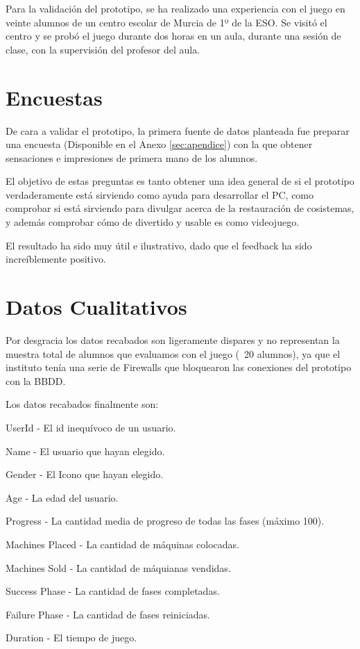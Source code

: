 Para la validación del prototipo, se ha realizado una experiencia con el juego en veinte alumnos de un centro escolar de Murcia de 1º de la ESO. Se visitó el centro y se probó el juego durante dos horas en un aula, durante una sesión de clase, con la supervisión del profesor del aula.

\section{Encuestas}

De cara a validar el prototipo, la primera fuente de datos planteada fue preparar una encuesta (Disponible en el Anexo \ref{sec:apendice}) con la que obtener sensaciones e impresiones de primera mano de los alumnos.

El objetivo de estas preguntas es tanto obtener una idea general de si el prototipo verdaderamente está sirviendo como ayuda para desarrollar el PC, como comprobar si está sirviendo para divulgar acerca de la restauración de cosistemas, y además comprobar cómo de divertido y usable es como videojuego.

El resultado ha sido muy útil e ilustrativo, dado que el feedback ha sido increíblemente positivo. 

\section{Datos Cualitativos}

Por desgracia los datos recabados son ligeramente dispares y no representan la muestra total de alumnos que evaluamos con el juego (~20 alumnos), ya que el instituto tenía una serie de Firewalls que bloquearon las conexiones del prototipo con la BBDD.

Los datos recabados finalmente son:

\begin{compactitem}
    \item User\textunderscore Id - El id inequívoco de un usuario.
    \item Name - El usuario que hayan elegido.
    \item Gender - El Icono que hayan elegido.
    \item Age - La edad del usuario.
    \item Progress - La cantidad media de progreso de todas las fases (máximo 100).
    \item Machines Placed - La cantidad de máquinas colocadas.
    \item Machines Sold - La cantidad de máquianas vendidas.
    \item Success Phase - La cantidad de fases completadas.
    \item Failure Phase - La cantidad de fases reiniciadas.
    \item Duration - El tiempo de juego.
\end{compactitem}

